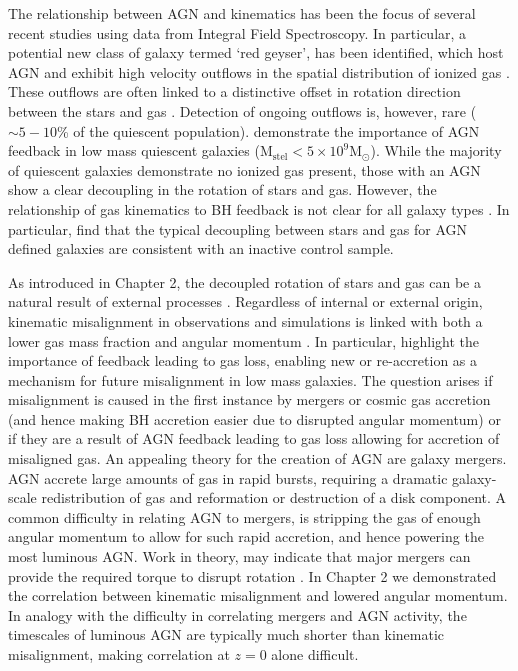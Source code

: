 The relationship between AGN and kinematics has been the focus of several recent studies using data from Integral Field Spectroscopy. In particular, a potential new class of galaxy termed `red geyser', has been identified, which host AGN and exhibit high velocity outflows in the spatial distribution of ionized gas \citep[][]{cheung2016}. These outflows are often linked to a distinctive offset in rotation direction between the stars and gas \citep{roy2018}. Detection of ongoing outflows is, however, rare ($\sim5-10$\% of the quiescent population). \citet{penny2018} demonstrate the importance of AGN feedback in low mass quiescent galaxies ($\mathrm{M_{stel} < 5 \times 10^{9}M_{\odot}}$). While the majority of quiescent galaxies demonstrate no ionized gas present, those with an AGN show a clear decoupling in the rotation of stars and gas. However, the relationship of gas kinematics to BH feedback is not clear for all galaxy types \citep[see also:][]{koudmani2019}. In particular, \citet{ilha2019} find that the typical decoupling between stars and gas for AGN defined galaxies are consistent with an inactive control sample. 

As introduced in Chapter 2, the decoupled rotation of stars and gas can be a natural result of external processes \cite[e.g.][]{davis2011, barrera2015, vdvoort2015, jin2016, bryant2019, duckworth2020a, li_decoupling2019}. Regardless of internal or external origin, kinematic misalignment in observations and simulations is linked with both a lower gas mass fraction and angular momentum \citep[as demonstrated in Chapter 2, see also;][]{starkenburg+19, khim2019}. In particular, \citet{starkenburg+19} highlight the importance of feedback leading to gas loss, enabling new or re-accretion as a mechanism for future misalignment in low mass galaxies. The question arises if misalignment is caused in the first instance by mergers or cosmic gas accretion (and hence making BH accretion easier due to disrupted angular momentum) or if they are a result of AGN feedback leading to gas loss allowing for accretion of misaligned gas. An appealing theory for the creation of AGN are galaxy mergers. AGN accrete large amounts of gas in rapid bursts, requiring a dramatic galaxy-scale redistribution of gas and reformation or destruction of a disk component. A common difficulty in relating AGN to mergers, is stripping the gas of enough angular momentum to allow for such rapid accretion, and hence powering the most luminous AGN. Work in theory, may indicate that major mergers can provide the required torque to disrupt rotation \citep[e.g.][]{toomre1972, dimatteo2005}. In Chapter 2 we demonstrated the correlation between kinematic misalignment and lowered angular momentum. In analogy with the difficulty in correlating mergers and AGN activity, the timescales of luminous AGN are typically much shorter than kinematic misalignment, making correlation at $z=0$ alone difficult. 

